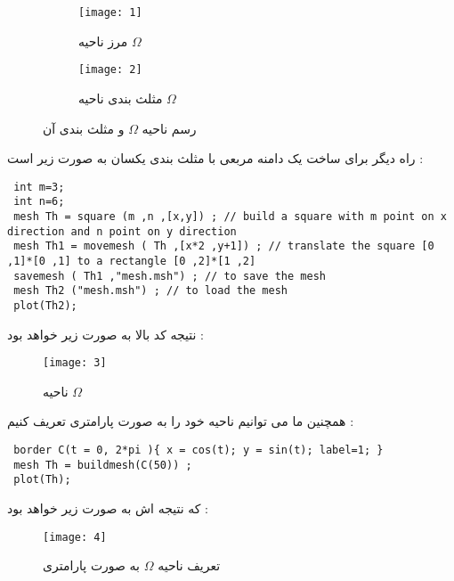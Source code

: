 \begin{figure}[hbt!]
	\centering
	\begin{subfigure}{.5\textwidth}
		\centering
		\texttt{[image: 1]}
		\caption{مرز ناحیه $\Omega$}
	\end{subfigure}%
	\begin{subfigure}{.5\textwidth}
		\centering
		\texttt{[image: 2]}
		\caption{مثلث بندی ناحیه $\Omega$}
	\end{subfigure}
	\caption{رسم ناحیه $\Omega$ و مثلث بندی آن}
\end{figure}
 راه دیگر برای ساخت یک دامنه مربعی با مثلث بندی یکسان به صورت زیر است :
\begin{LTR}
	\begin{lstlisting}
 int m=3;
 int n=6;
 mesh Th = square (m ,n ,[x,y]) ; // build a square with m point on x direction and n point on y direction
 mesh Th1 = movemesh ( Th ,[x*2 ,y+1]) ; // translate the square [0 ,1]*[0 ,1] to a rectangle [0 ,2]*[1 ,2]
 savemesh ( Th1 ,"mesh.msh") ; // to save the mesh
 mesh Th2 ("mesh.msh") ; // to load the mesh
 plot(Th2);
	\end{lstlisting}
\end{LTR} 
نتیجه کد بالا به صورت زیر خواهد بود :
\begin{figure}[hbt!]
	\centering
	\texttt{[image: 3]}
	\caption{ ناحیه $\Omega$}
\end{figure}
همچنین ما می توانیم ناحیه خود را به صورت پارامتری تعریف کنیم :
\begin{LTR}
	\begin{lstlisting}
 border C(t = 0, 2*pi ){ x = cos(t); y = sin(t); label=1; }
 mesh Th = buildmesh(C(50)) ;
 plot(Th);
	\end{lstlisting}
\end{LTR} 
که نتیجه اش به صورت زیر خواهد بود :

\begin{figure}[hbt!]
	\centering
	\texttt{[image: 4]}
	\caption{ تعریف ناحیه $\Omega$ به صورت پارامتری}
\end{figure}

